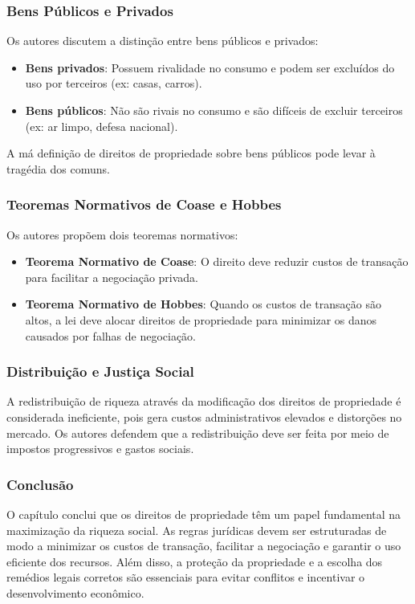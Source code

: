 \documentclass[a4paper,12pt]{article}[abntex2]
\begin{document}
\subsubsection{Bens Públicos e Privados}
Os autores discutem a distinção entre bens públicos e privados:
\begin{itemize}
    \item \textbf{Bens privados}: Possuem rivalidade no consumo e podem ser excluídos do uso por terceiros (ex: casas, carros).
    \item \textbf{Bens públicos}: Não são rivais no consumo e são difíceis de excluir terceiros (ex: ar limpo, defesa nacional).
\end{itemize}

A má definição de direitos de propriedade sobre bens públicos pode levar à tragédia dos comuns.

\subsubsection{Teoremas Normativos de Coase e Hobbes}
Os autores propõem dois teoremas normativos:
\begin{itemize}
    \item \textbf{Teorema Normativo de Coase}: O direito deve reduzir custos de transação para facilitar a negociação privada.
    \item \textbf{Teorema Normativo de Hobbes}: Quando os custos de transação são altos, a lei deve alocar direitos de propriedade para minimizar os danos causados por falhas de negociação.
\end{itemize}

\subsubsection{Distribuição e Justiça Social}
A redistribuição de riqueza através da modificação dos direitos de propriedade é considerada ineficiente, pois gera custos administrativos elevados e distorções no mercado. Os autores defendem que a redistribuição deve ser feita por meio de impostos progressivos e gastos sociais.

\subsubsection{Conclusão}
O capítulo conclui que os direitos de propriedade têm um papel fundamental na maximização da riqueza social. As regras jurídicas devem ser estruturadas de modo a minimizar os custos de transação, facilitar a negociação e garantir o uso eficiente dos recursos. Além disso, a proteção da propriedade e a escolha dos remédios legais corretos são essenciais para evitar conflitos e incentivar o desenvolvimento econômico.
\end{document}
